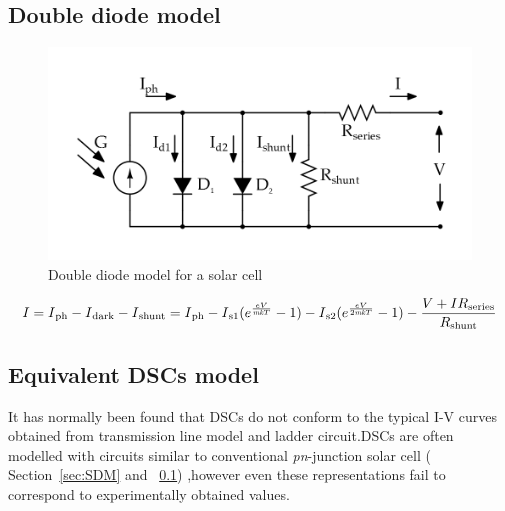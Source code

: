 \subsection{Double diode model}\label{sec:DDM}
 \begin{figure}[H]
  \begin{center}
  \includegraphics[width=\textwidth]{images/Double_diode_model}
  \caption{ Double diode model for a solar cell }
  \label{fig:Double_EQu_cell}
  \end{center}
  \end{figure}
  
  \begin{equation}
   \begin{aligned}
    I = I\textsubscript{ph} - I\textsubscript{dark} - I\textsubscript{shunt} = I\textsubscript{ph} -  I\textsubscript{s1} (e^{\frac{eV}{\textit{mk}T}}-1) - I\textsubscript{s2} (e^{\frac{eV}{2\textit{mk}T}}-1)- \dfrac{V+IR\textsubscript{series}}{R\textsubscript{shunt}}
     \label{eq:equ_current_double}
    \end{aligned}
    \end{equation}
  
\subsection{Equivalent DSCs model}

It has normally been found that \ac{DSCs} do not conform to the typical I-V curves obtained from transmission line model and ladder circuit\cite{yong2008modeling}.\ac{DSCs} are often modelled with circuits similar to conventional \textit{pn}-junction solar cell ( Section~\ref{sec:SDM} and ~\ref{sec:DDM}) ,however even these representations fail to correspond to experimentally obtained values.

